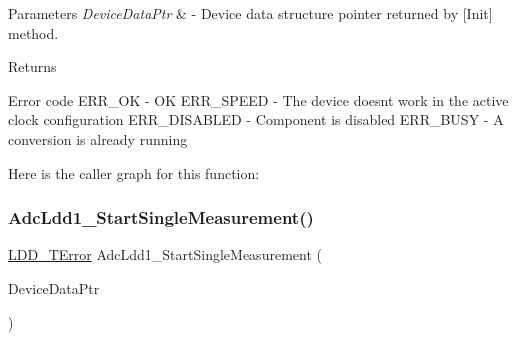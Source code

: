 \begin{DoxyParams}{Parameters}
{\em Device\+Data\+Ptr} & -\/ Device data structure pointer returned by \mbox{[}Init\mbox{]} method. \\
\hline
\end{DoxyParams}
\begin{DoxyReturn}{Returns}

\begin{DoxyItemize}
\item Error code E\+R\+R\+\_\+\+OK -\/ OK E\+R\+R\+\_\+\+S\+P\+E\+ED -\/ The device doesn\textquotesingle{}t work in the active clock configuration E\+R\+R\+\_\+\+D\+I\+S\+A\+B\+L\+ED -\/ Component is disabled E\+R\+R\+\_\+\+B\+U\+SY -\/ A conversion is already running 
\end{DoxyItemize}
\end{DoxyReturn}
Here is the caller graph for this function\+:
\mbox{\label{group___adc_ldd1__module_ga00728ff1e652d8d8d778917ca27e37a1}} 
\subsubsection{\texorpdfstring{Adc\+Ldd1\+\_\+\+Start\+Single\+Measurement()}{AdcLdd1\_StartSingleMeasurement()}}
{\footnotesize\ttfamily \hyperlink{group___p_e___types__module_ga24c2b045fd04e79e85f261ce4df35588}{L\+D\+D\+\_\+\+T\+Error} Adc\+Ldd1\+\_\+\+Start\+Single\+Measurement (\begin{DoxyParamCaption}\item[{\hyperlink{group___p_e___types__module_gac5cf1362f1f0e3a2ce71b1bf2276d091}{L\+D\+D\+\_\+\+T\+Device\+Data} $\ast$}]{Device\+Data\+Ptr }\end{DoxyParamCaption})}



